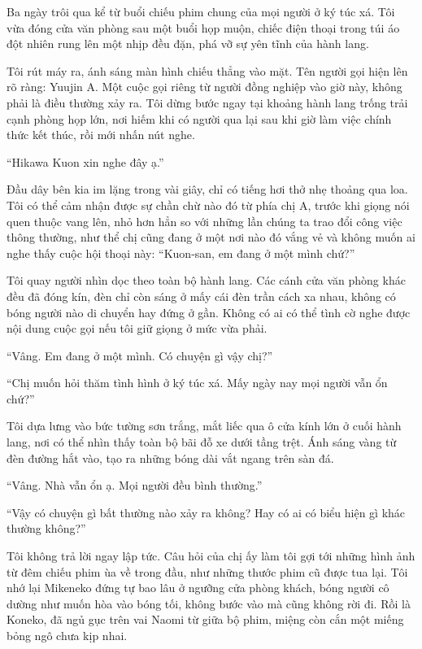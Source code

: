 \documentclass[../main.tex]{subfiles}
\begin{document}

Ba ngày trôi qua kể từ buổi chiếu phim chung của mọi người ở ký túc xá. Tôi vừa đóng cửa văn phòng sau một buổi họp muộn, chiếc điện thoại trong túi áo đột nhiên rung lên một nhịp đều đặn, phá vỡ sự yên tĩnh của hành lang.

Tôi rút máy ra, ánh sáng màn hình chiếu thẳng vào mặt. Tên người gọi hiện lên rõ ràng: Yuujin A. Một cuộc gọi riêng từ người đồng nghiệp vào giờ này, không phải là điều thường xảy ra. Tôi dừng bước ngay tại khoảng hành lang trống trải cạnh phòng họp lớn, nơi hiếm khi có người qua lại sau khi giờ làm việc chính thức kết thúc, rồi mới nhấn nút nghe.

``Hikawa Kuon xin nghe đây ạ.''

Đầu dây bên kia im lặng trong vài giây, chỉ có tiếng hơi thở nhẹ thoảng qua loa. Tôi có thể cảm nhận được sự chần chừ nào đó từ phía chị A, trước khi giọng nói quen thuộc vang lên, nhỏ hơn hẳn so với những lần chúng ta trao đổi công việc thông thường, như thể chị cũng đang ở một nơi nào đó vắng vẻ và không muốn ai nghe thấy cuộc hội thoại này: ``Kuon-san, em đang ở một mình chứ?''

Tôi quay người nhìn dọc theo toàn bộ hành lang. Các cánh cửa văn phòng khác đều đã đóng kín, đèn chỉ còn sáng ở mấy cái đèn trần cách xa nhau, không có bóng người nào di chuyển hay đứng ở gần. Không có ai có thể tình cờ nghe được nội dung cuộc gọi nếu tôi giữ giọng ở mức vừa phải.

``Vâng. Em đang ở một mình. Có chuyện gì vậy chị?''

``Chị muốn hỏi thăm tình hình ở ký túc xá. Mấy ngày nay mọi người vẫn ổn chứ?''

Tôi dựa lưng vào bức tường sơn trắng, mắt liếc qua ô cửa kính lớn ở cuối hành lang, nơi có thể nhìn thấy toàn bộ bãi đỗ xe dưới tầng trệt. Ánh sáng vàng từ đèn đường hắt vào, tạo ra những bóng dài vắt ngang trên sàn đá.

``Vâng. Nhà vẫn ổn ạ. Mọi người đều bình thường.''

``Vậy có chuyện gì bất thường nào xảy ra không? Hay có ai có biểu hiện gì khác thường không?''

Tôi không trả lời ngay lập tức. Câu hỏi của chị ấy làm tôi gợi tới những hình ảnh từ đêm chiếu phim ùa về trong đầu, như những thước phim cũ được tua lại. Tôi nhớ lại Mikeneko đứng tự bao lâu ở ngưỡng cửa phòng khách, bóng người cô dường như muốn hòa vào bóng tối, không bước vào mà cũng không rời đi. Rồi là Koneko, đã ngủ gục trên vai Naomi từ giữa bộ phim, miệng còn cắn một miếng bỏng ngô chưa kịp nhai.
\end{document}
